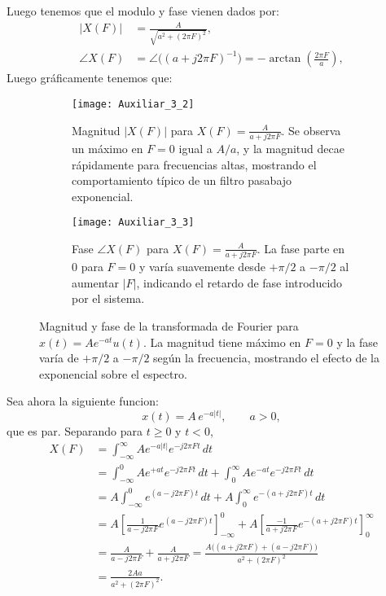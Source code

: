 \documentclass[
  11pt,
  letterpaper,
   addpoints,
   answers
  ]{exam}
\begin{document}
\begin{questions}
\begin{solution}
Luego tenemos que el modulo y fase vienen dados por:
\begin{align}
|X(F)|
  &= \frac{A}{\sqrt{a^{2}+(2\pi F)^{2}}},\\
\angle X(F)
  &= \angle\big((a+j2\pi F)^{-1}\big)
   = -\arctan\!\left(\frac{2\pi F}{a}\right),
\end{align}
Luego gráficamente tenemos que: 

\begin{figure}[H]
  \centering

  \begin{subfigure}[t]{0.48\textwidth}
    \centering
    \texttt{[image: Auxiliar\_3\_2]} %
    \caption{Magnitud $|X(F)|$ para $X(F)=\frac{A}{a+j2\pi F}$. Se observa un máximo en $F=0$ igual a $A/a$, y la magnitud decae rápidamente para frecuencias altas, mostrando el comportamiento típico de un filtro pasabajo exponencial.}
    \label{fig:mag_XF}
  \end{subfigure}
  \hfill
  \begin{subfigure}[t]{0.48\textwidth}
    \centering
    \texttt{[image: Auxiliar\_3\_3]}
    \caption{Fase $\angle X(F)$ para $X(F)=\frac{A}{a+j2\pi F}$. La fase parte en $0$ para $F=0$ y varía suavemente desde $+\pi/2$ a $-\pi/2$ al aumentar $|F|$, indicando el retardo de fase introducido por el sistema.}
    \label{fig:fase_XF}
  \end{subfigure}

  \caption{Magnitud y fase de la transformada de Fourier para $x(t)=A e^{-a t}u(t)$. La magnitud tiene máximo en $F=0$ y la fase varía de $+\pi/2$ a $-\pi/2$ según la frecuencia, mostrando el efecto de la exponencial sobre el espectro.}
  \label{fig:mag_fase_XF}
\end{figure}


Sea ahora la siguiente funcion:
\[
x(t)=A\,e^{-a|t|},\qquad a>0,
\]
que es par. Separando para \(t\ge 0\) y \(t<0\),
\begin{align}
X(F)
 &= \int_{-\infty}^{\infty} A e^{-a|t|} e^{-j2\pi F t}\,dt \\
 &= \int_{-\infty}^{0} A e^{+a t} e^{-j2\pi F t}\,dt
   + \int_{0}^{\infty} A e^{-a t} e^{-j2\pi F t}\,dt \\
 &= A\int_{-\infty}^{0} e^{(a-j2\pi F)t}\,dt
   +A\int_{0}^{\infty} e^{-(a+j2\pi F)t}\,dt \\
 &= A\left[\frac{1}{a-j2\pi F}e^{(a-j2\pi F)t}\right]_{-\infty}^{0}
   +A\left[\frac{-1}{a+j2\pi F}e^{-(a+j2\pi F)t}\right]_{0}^{\infty} \\
 &= \frac{A}{a-j2\pi F}+\frac{A}{a+j2\pi F}
  = \frac{A\big((a+j2\pi F)+(a-j2\pi F)\big)}{a^{2}+(2\pi F)^{2}} \\
 &= \frac{2A a}{a^{2}+(2\pi F)^{2}}.
\end{align}


\end{solution}
\end{questions}
\end{document}
